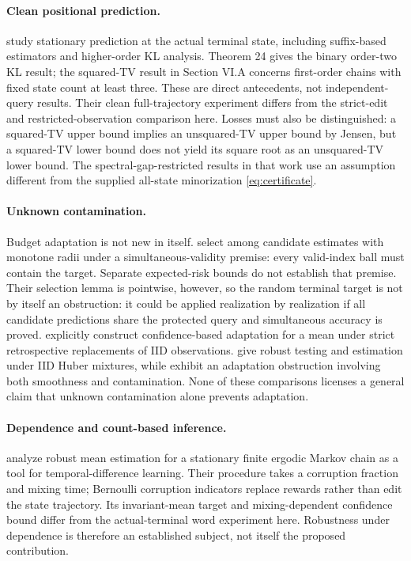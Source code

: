 \documentclass[11pt,letterpaper]{article}
\theoremstyle{definition}
\theoremstyle{remark}
\numberwithin{equation}{section}
\begin{document}
\paragraph{Clean positional prediction.}
\citet[model (1), Theorem 24, and Section VI.A]{HanJanaWu2023} study stationary prediction at the actual terminal state, including suffix-based estimators and higher-order KL analysis. Theorem 24 gives the binary order-two KL result; the squared-TV result in Section VI.A concerns first-order chains with fixed state count at least three. These are direct antecedents, not independent-query results. Their clean full-trajectory experiment differs from the strict-edit and restricted-observation comparison here. Losses must also be distinguished: a squared-TV upper bound implies an unsquared-TV upper bound by Jensen, but a squared-TV lower bound does not yield its square root as an unsquared-TV lower bound. The spectral-gap-restricted results in that work use an assumption different from the supplied all-state minorization \eqref{eq:certificate}.

\paragraph{Unknown contamination.}
Budget adaptation is not new in itself. \citet{JainOrlitskyRavindrakumar2022} select among candidate estimates with monotone radii under a simultaneous-validity premise: every valid-index ball must contain the target. Separate expected-risk bounds do not establish that premise. Their selection lemma is pointwise, however, so the random terminal target is not by itself an obstruction: it could be applied realization by realization if all candidate predictions share the protected query and simultaneous accuracy is proved. \citet{BhattEtAl2022} explicitly construct confidence-based adaptation for a mean under strict retrospective replacements of IID observations. \citet{ChenGaoRen2016} give robust testing and estimation under IID Huber mixtures, while \citet{LiuGao2019} exhibit an adaptation obstruction involving both smoothness and contamination. None of these comparisons licenses a general claim that unknown contamination alone prevents adaptation.

\paragraph{Dependence and count-based inference.}
\citet[Theorem 2]{MaityMitra2025} analyze robust mean estimation for a stationary finite ergodic Markov chain as a tool for temporal-difference learning. Their procedure takes a corruption fraction and mixing time; Bernoulli corruption indicators replace rewards rather than edit the state trajectory. Its invariant-mean target and mixing-dependent confidence bound differ from the actual-terminal word experiment here. Robustness under dependence is therefore an established subject, not itself the proposed contribution.
\end{document}
